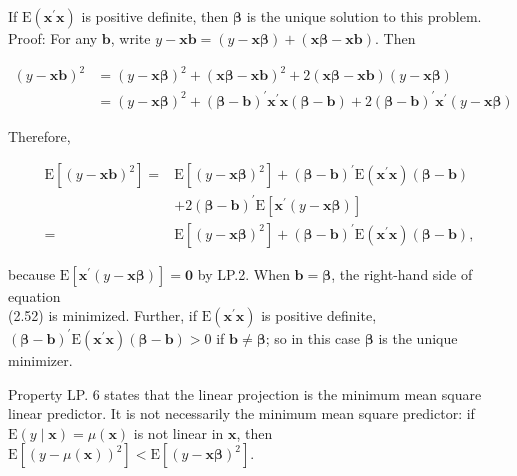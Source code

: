\documentclass[10pt]{article}
\begin{document}
If $\mathrm{E}\left(\mathbf{x}^{\prime} \mathbf{x}\right)$ is positive definite, then $\boldsymbol{\beta}$ is the unique solution to this problem.\\
Proof: For any $\mathbf{b}$, write $y-\mathbf{x b}=(y-\mathbf{x} \boldsymbol{\beta})+(\mathbf{x} \boldsymbol{\beta}-\mathbf{x b})$. Then

$$
\begin{aligned}
(y-\mathbf{x} \mathbf{b})^{2} & =(y-\mathbf{x} \boldsymbol{\beta})^{2}+(\mathbf{x} \boldsymbol{\beta}-\mathbf{x} \mathbf{b})^{2}+2(\mathbf{x} \boldsymbol{\beta}-\mathbf{x} \mathbf{b})(y-\mathbf{x} \boldsymbol{\beta}) \\
& =(y-\mathbf{x} \boldsymbol{\beta})^{2}+(\boldsymbol{\beta}-\mathbf{b})^{\prime} \mathbf{x}^{\prime} \mathbf{x}(\boldsymbol{\beta}-\mathbf{b})+2(\boldsymbol{\beta}-\mathbf{b})^{\prime} \mathbf{x}^{\prime}(y-\mathbf{x} \boldsymbol{\beta})
\end{aligned}
$$

Therefore,


\begin{align*}
\mathrm{E}\left[(y-\mathbf{x b})^{2}\right]= & \mathrm{E}\left[(y-\mathbf{x} \boldsymbol{\beta})^{2}\right]+(\boldsymbol{\beta}-\mathbf{b})^{\prime} \mathrm{E}\left(\mathbf{x}^{\prime} \mathbf{x}\right)(\boldsymbol{\beta}-\mathbf{b}) \\
& +2(\boldsymbol{\beta}-\mathbf{b})^{\prime} \mathrm{E}\left[\mathbf{x}^{\prime}(y-\mathbf{x} \boldsymbol{\beta})\right] \\
= & \mathrm{E}\left[(y-\mathbf{x} \boldsymbol{\beta})^{2}\right]+(\boldsymbol{\beta}-\mathbf{b})^{\prime} \mathrm{E}\left(\mathbf{x}^{\prime} \mathbf{x}\right)(\boldsymbol{\beta}-\mathbf{b}), \tag{2.52}
\end{align*}


because $\mathrm{E}\left[\mathbf{x}^{\prime}(y-\mathbf{x} \boldsymbol{\beta})\right]=\mathbf{0}$ by LP.2. When $\mathbf{b}=\boldsymbol{\beta}$, the right-hand side of equation\\
(2.52) is minimized. Further, if $\mathrm{E}\left(\mathbf{x}^{\prime} \mathbf{x}\right)$ is positive definite, $(\boldsymbol{\beta}-\mathbf{b})^{\prime} \mathrm{E}\left(\mathbf{x}^{\prime} \mathbf{x}\right)(\boldsymbol{\beta}-\mathbf{b})>0$ if $\mathbf{b} \neq \boldsymbol{\beta}$; so in this case $\boldsymbol{\beta}$ is the unique minimizer.

Property LP. 6 states that the linear projection is the minimum mean square linear predictor. It is not necessarily the minimum mean square predictor: if $\mathrm{E}(y \mid \mathbf{x})=\mu(\mathbf{x})$ is not linear in $\mathbf{x}$, then\\
$\mathrm{E}\left[(y-\mu(\mathbf{x}))^{2}\right]<\mathrm{E}\left[(y-\mathbf{x} \boldsymbol{\beta})^{2}\right]$.
\end{document}

